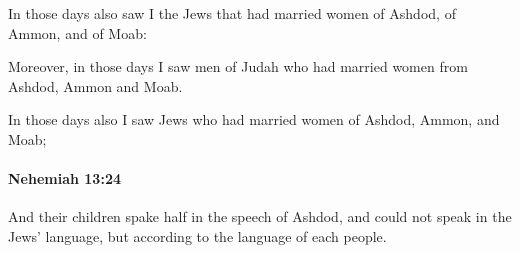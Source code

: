 			\begin{versebox}
					\item[BHS] 
					\item[LXX] 
					\item[ASV] In those days also saw I the Jews that had married women of Ashdod, of Ammon, and of Moab:
					\item[NIV] Moreover, in those days I saw men of Judah who had married women from Ashdod, Ammon and Moab.
					\item[NRSV] In those days also I saw Jews who had married women of Ashdod, Ammon, and Moab;
			\end{versebox}

		\paragraph{Nehemiah 13:24} %
			\label{NEHEMIAH-13-24}

			And their children spake half in the speech of Ashdod, and could not speak in the Jews’ language, but according to the language of each people.

